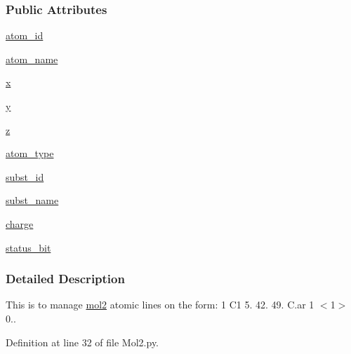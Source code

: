 \subsubsection*{Public Attributes}
\begin{DoxyCompactItemize}
\item 
\hyperlink{classforcebalance_1_1Mol2_1_1mol2__atom_ae072f2fb60ea8f0fb050b6bf50043335}{atom\-\_\-id}
\item 
\hyperlink{classforcebalance_1_1Mol2_1_1mol2__atom_a33e23aaa6ca33a5e9d6a71e2bc723db3}{atom\-\_\-name}
\item 
\hyperlink{classforcebalance_1_1Mol2_1_1mol2__atom_a6680fe011206f55945c3941e0108f34f}{x}
\item 
\hyperlink{classforcebalance_1_1Mol2_1_1mol2__atom_ae74389ec40d89eed9f4685de924cd6e0}{y}
\item 
\hyperlink{classforcebalance_1_1Mol2_1_1mol2__atom_a24f92b1eb86891ecdfdeb539d29f01eb}{z}
\item 
\hyperlink{classforcebalance_1_1Mol2_1_1mol2__atom_a4078ea47e356c953642f29ffb16cdeb0}{atom\-\_\-type}
\item 
\hyperlink{classforcebalance_1_1Mol2_1_1mol2__atom_a22285aca02cdeb7d57ab73afe219813a}{subst\-\_\-id}
\item 
\hyperlink{classforcebalance_1_1Mol2_1_1mol2__atom_a749f2ae50cb4ae98d0b7e97df078860c}{subst\-\_\-name}
\item 
\hyperlink{classforcebalance_1_1Mol2_1_1mol2__atom_a485a7e9b861ff46051e799d2235f1c3b}{charge}
\item 
\hyperlink{classforcebalance_1_1Mol2_1_1mol2__atom_a85929f97435a50a600cf6d440ba47e59}{status\-\_\-bit}
\end{DoxyCompactItemize}


\subsubsection{Detailed Description}
This is to manage \hyperlink{classforcebalance_1_1Mol2_1_1mol2}{mol2} atomic lines on the form\-: 1 C1 5. 42. 49. C.\-ar 1 $<$1$>$ 0.. 

Definition at line 32 of file Mol2.\-py.



